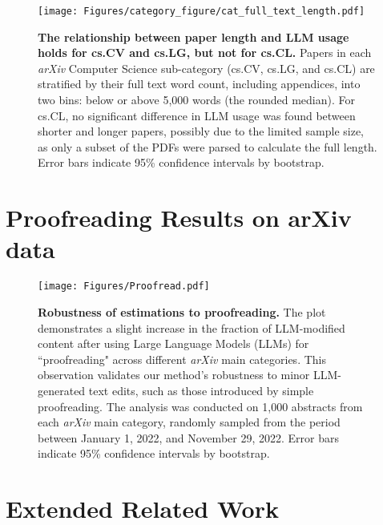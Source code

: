 \documentclass{article}
\begin{document}
\begin{figure}[htb!] 
    \centering
    \texttt{[image: Figures/category\_figure/cat\_full\_text\_length.pdf]}
    \caption{    
\textbf{The relationship between paper length and LLM usage holds for cs.CV and cs.LG, but not for cs.CL.}
Papers in each \textit{arXiv} Computer Science sub-category (cs.CV, cs.LG, and cs.CL) are stratified by their full text word count, including appendices, into two bins: below or above 5,000 words (the rounded median). 
For cs.CL, no significant difference in LLM usage was found between shorter and longer papers, possibly due to the limited sample size, as only a subset of the PDFs were parsed to calculate the full length.
Error bars indicate 95\% confidence intervals by bootstrap.
    }
    \label{supp:figure:length}
\end{figure}
\newpage 
\clearpage


\section{Proofreading Results on arXiv data}
\label{supp:sec:proofreading}
\begin{figure}[ht!]
    \centering
    \texttt{[image: Figures/Proofread.pdf]}
\caption{
    \textbf{Robustness of estimations to proofreading.} 
The plot demonstrates a slight increase in the fraction of LLM-modified content after using Large Language Models (LLMs) for ``proofreading" across different \textit{arXiv} main categories. This observation validates our method's robustness to minor LLM-generated text edits, such as those introduced by simple proofreading. 
The analysis was conducted on 1,000 abstracts from each \textit{arXiv} main category, randomly sampled from the period between January 1, 2022, and November 29, 2022.
Error bars indicate 95\% confidence intervals by bootstrap.
}
\label{supp:figure:proofreading}
\end{figure}

\newpage 
\clearpage
 \section{Extended Related Work}
\label{appendix:sec:related-work}
\end{document}
